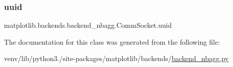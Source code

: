 \subsubsection{\texorpdfstring{uuid}{uuid}}
{\footnotesize\ttfamily matplotlib.\+backends.\+backend\+\_\+nbagg.\+Comm\+Socket.\+uuid}



The documentation for this class was generated from the following file\+:\begin{DoxyCompactItemize}
\item 
venv/lib/python3./site-\/packages/matplotlib/backends/\hyperlink{backend__nbagg_8py}{backend\+\_\+nbagg.\+py}\end{DoxyCompactItemize}
